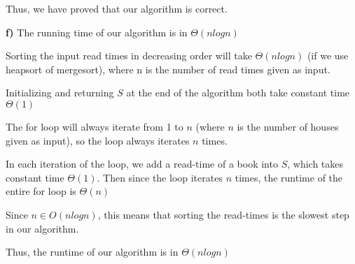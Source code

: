 \documentclass{article}
\begin{document}
Thus, we have proved that our algorithm is correct.



\textbf{f)} 
The running time of our algorithm is in $\Theta(n log n)$

Sorting the input read times in decreasing order will take $\Theta(nlogn)$ (if we use heapsort of mergesort), where n is the number of read times given as input.

Initializing and returning $S$ at the end of the algorithm both take constant time $\Theta(1)$

The for loop will always iterate from 1 to $n$ (where $n$ is the number of houses given as input), so the loop always iterates $n$ times.

In each iteration of the loop, we add a read-time of a book into $S$, which takes constant time $\Theta(1)$. Then since the loop iterates $n$ times, the runtime of the entire for loop is $\Theta(n)$

Since $n \in O(nlogn)$, this means that sorting the read-times is the slowest step in our algorithm.

Thus, the runtime of our algorithm is in $\Theta(nlogn)$
\end{document}
